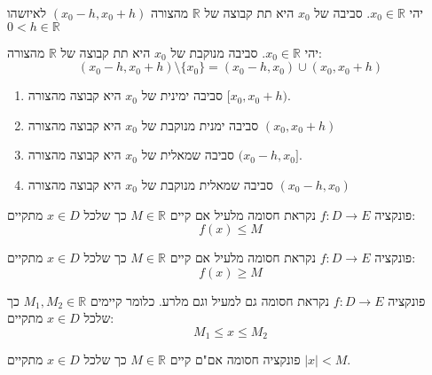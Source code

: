 \documentclass{tstextbook}
\begin{document}
\begin{definition}
יהי \(x_{0} \in \mathbb{R}\). סביבה של \(x_{0}\) היא תת קבוצה של \(\mathbb{R}\) מהצורה \((x_{0}-h,x_{0}+h)\) לאיזשהו \(0<h \in \mathbb{R}\)

\end{definition}
\begin{definition}
יהי \(x_{0} \in \mathbb{R}\). סביבה מנוקבת של \(x_{0}\) היא תת קבוצה של \(\mathbb{R}\) מהצורה:
$$(x_{0}-h,x_{0}+h)\setminus \{ x_{0} \}=(x_{0}-h, x_{0})\cup (x_{0},x_{0}+h)$$

\end{definition}
\begin{definition}
  \begin{enumerate}
    \item סביבה ימינית של \(x_{0}\) היא קבוצה מהצורה \([x_{0},x_{0}+h)\). 


    \item סביבה ימנית מנוקבת של \(x_{0}\) היא קבוצה מהצורה \((x_{0},x_{0}+h)\)


    \item סביבה שמאלית של \(x_{0}\) היא קבוצה מהצורה \((x_{0}-h,x_{0}]\). 


    \item סביבה שמאלית מנוקבת של \(x_{0}\) היא קבוצה מהצורה \((x_{0}-h,x_{0})\)


  \end{enumerate}
\end{definition}
\begin{definition}
פונקציה \(f:D\to E\) נקראת חסומה מלעיל אם קיים \(M \in \mathbb{R}\) כך שלכל \(x \in D\) מתקיים:
$$f(x)\leq M$$

\end{definition}
\begin{definition}
פונקציה \(f:D\to E\) נקראת חסומה מלעיל אם קיים \(M \in \mathbb{R}\) כך שלכל \(x \in D\) מתקיים:
$$f(x)\geq M$$

\end{definition}
\begin{definition}
פונקציה \(f:D\to E\) נקראת חסומה גם למעיל וגם מלרע. כלומר קיימים \(M_{1},M_{2}\in \mathbb{R}\) כך שלכל \(x \in D\) מתקיים:
$$M_{1}\leq x \leq M_{2}$$

\end{definition}
\begin{corollary}
פונקציה חסומה אם"ם קיים \(M \in \mathbb{R}\) כך שלכל \(x \in D\) מתקיים \(|x|<M\).

\end{corollary}
\end{document}
